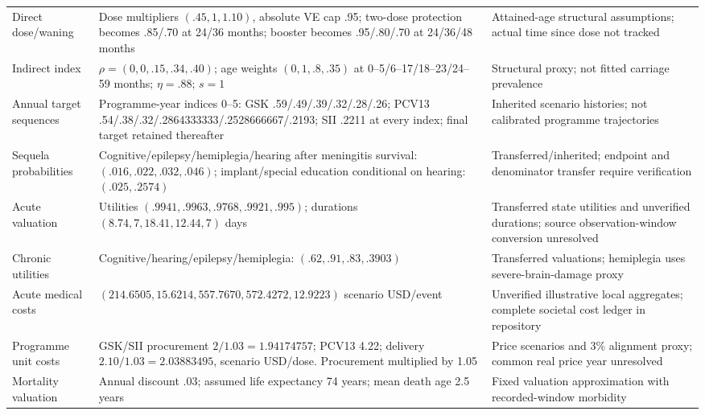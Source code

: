 \documentclass[10pt,letterpaper]{article}
\begin{document}
\begin{longtable}{L{2.8cm}L{7.7cm}L{3.8cm}}
Direct dose/waning & Dose multipliers $(.45,1,1.10)$, absolute VE cap .95; two-dose protection becomes .85/.70 at 24/36 months; booster becomes .95/.80/.70 at 24/36/48 months & Attained-age structural assumptions; actual time since dose not tracked \\
Indirect index & $\rho=(0,0,.15,.34,.40)$; age weights $(0,1,.8,.35)$ at 0--5/6--17/18--23/24--59 months; $\eta=.88$; $s=1$ & Structural proxy; not fitted carriage prevalence \\
Annual target sequences & Programme-year indices 0--5: GSK .59/.49/.39/.32/.28/.26; PCV13 .54/.38/.32/.2864333333/.2528666667/.2193; SII .2211 at every index; final target retained thereafter & Inherited scenario histories; not calibrated programme trajectories \\
Sequela probabilities & Cognitive/epilepsy/hemiplegia/hearing after meningitis survival: $(.016,.022,.032,.046)$; implant/special education conditional on hearing: $(.025,.2574)$ & Transferred/inherited; endpoint and denominator transfer require verification \\
Acute valuation & Utilities $(.9941,.9963,.9768,.9921,.995)$; durations $(8.74,7,18.41,12.44,7)$ days & Transferred state utilities and unverified durations; source observation-window conversion unresolved \\
Chronic utilities & Cognitive/hearing/epilepsy/hemiplegia: $(.62,.91,.83,.3903)$ & Transferred valuations; hemiplegia uses severe-brain-damage proxy \\
Acute medical costs & $(214.6505,15.6214,557.7670,572.4272,12.9223)$ scenario USD/event & Unverified illustrative local aggregates; complete societal cost ledger in repository \\
Programme unit costs & GSK/SII procurement $2/1.03=1.94174757$; PCV13 4.22; delivery $2.10/1.03=2.03883495$, scenario USD/dose. Procurement multiplied by 1.05 & Price scenarios and 3\% alignment proxy; common real price year unresolved \\
Mortality valuation & Annual discount .03; assumed life expectancy 74 years; mean death age 2.5 years & Fixed valuation approximation with recorded-window morbidity \\
\bottomrule
\end{longtable}\endgroup
\end{document}
